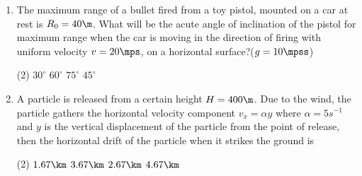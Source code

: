 \documentclass{article}
\renewcommand{\ans}{\quad}
\begin{document}
\begin{enumerate}
        \begin{multicols}{2}
            \begin{tasks}(1)
                \task $\dfrac{h}{H} = \dfrac{1}{2}$\ans
                \task $\dfrac{h}{H} = \dfrac{1}{3}$
                \task $\dfrac{h}{H} = \dfrac{1}{4}$
                \task $\dfrac{h}{H} = \dfrac{1}{5}$
            \end{tasks}
            \begin{center}
            \end{center}
        \end{multicols}
        
	
	
	\item The maximum range of a bullet fired from a toy pistol, mounted on a car at rest is $R_0 = 40 \m$. What will be the acute angle of inclination of the pistol for maximum range when the car is moving in the direction of firing with uniform velocity $v = 20 \mps$, on a horizontal surface?($g=10\mpss$)
	\begin{tasks}(2)
		\task $30^\circ$
		\task $60^\circ$\ans
		\task $75^\circ$
		\task $45^\circ$
	\end{tasks}
	
	
	\item A particle is released from a certain height $H = 400 \m$. Due to the wind, the particle gathers the horizontal velocity component $v_x = \alpha y$ where $\alpha = 5 s^{-1}$ and $y$ is the vertical displacement of the particle from the point of release, then the horizontal drift of the particle when it strikes the ground is
	\begin{tasks}(2)
		\task $1.67\km$
		\task $3.67\km$
		\task $2.67\km$\ans
		\task $4.67\km$
	\end{tasks}
	
	
	

\end{enumerate}
\end{document}
